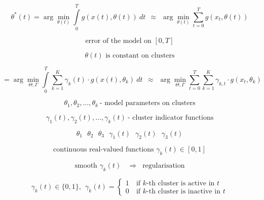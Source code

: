 \documentclass{article}
\begin{document}
\begin{displaymath}
 \theta^{*}(t) = \arg \min\limits_{\theta(t)} \int\limits_{0}^{T} g(x(t), \theta(t)) ~dt
  ~~ \approx ~~ 
  \arg \min\limits_{\theta(t)} \sum\limits_{t=0}^{T} g(x_t, \theta(t))
\end{displaymath}

\begin{displaymath}
 \textrm{error of the model on $[0,T]$}
\end{displaymath}

\begin{displaymath}
 \textrm{$\theta(t)$ is constant on clusters}
\end{displaymath}

\begin{displaymath}
 [\Theta^{*}, \Gamma^{*}(t) ] = \arg \min\limits_{\Theta,\Gamma} \int\limits_{0}^{T} \sum\limits_{k=1}^K \gamma_k(t) \cdot g(x(t), \theta_k) ~dt
  ~~ \approx ~~ 
  \arg \min\limits_{\Theta,\Gamma} \sum\limits_{t=0}^{T} \sum\limits_{k=1}^{K} \gamma_{k,t} \cdot g(x_t, \theta_k)
\end{displaymath}

\begin{displaymath}
 \theta_1, \theta_2, \dots, \theta_k ~\textrm{- model parameters on clusters}
\end{displaymath}

\begin{displaymath}
 \gamma_1(t), \gamma_2(t), \dots, \gamma_k(t) ~\textrm{- cluster indicator functions}
\end{displaymath}

\begin{displaymath}
 \theta_1 ~~~ \theta_2 ~~~ \theta_3 ~~~ \gamma_1(t) ~~~ \gamma_2(t) ~~~ \gamma_3(t) 
\end{displaymath}

\begin{displaymath}
 \textrm{continuous real-valued functions $\gamma_k(t) \in [0,1]$}
\end{displaymath}

\begin{displaymath}
 \textrm{smooth $\gamma_k(t)$ $~\Rightarrow~$ regularisation}
\end{displaymath}

\begin{displaymath}
 \gamma_k(t) \in \lbrace 0,1 \rbrace, ~~
 \gamma_k(t) =
 \left\lbrace
  \begin{array}{ll}
   1~ & \textrm{if $k$-th cluster is active in $t$} \\
   0~ & \textrm{if $k$-th cluster is inactive in $t$}
  \end{array}
 \right.
\end{displaymath}
\end{document}
